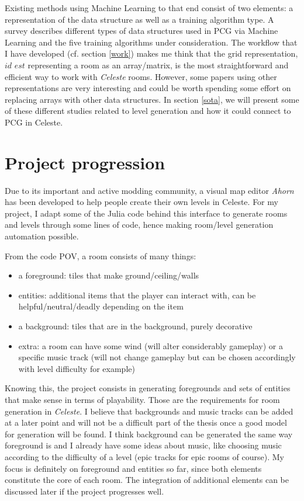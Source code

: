 \documentclass{article}
\newcommand{\Celeste}{\textit{Celeste} }
\newcommand{\Celnosp}{\textit{Celeste}}
\begin{document}
\vspace{0.25cm}
\noindent Existing methods using Machine Learning to that end consist of two elements: a representation of the data structure as well as a training algorithm type. A survey \cite{summer} describes different types of data structures used in PCG via Machine Learning and the five training algorithms under consideration. The workflow that I have developed (cf. section \ref{work}) makes me think that the grid representation, $\textit{id est}$ representing a room as an array/matrix, is the most straightforward and efficient way to work with \Celeste rooms. However, some papers using other representations are very interesting and could be worth spending some effort on replacing arrays with other data structures. In section \ref{sota}, we will present some of these different studies related to level generation and how it could connect to PCG in Celeste.


\section{Project progression \label{work}}
Due to its important and active modding community, a visual map editor \textit{Ahorn} has been developed to help people create their own levels in Celeste. For my project, I adapt some of the Julia code behind this interface to generate rooms and levels through some lines of code, hence making room/level generation automation possible.

\noindent From the code POV, a room consists of many things:
\begin{itemize}
    \item a foreground: tiles that make ground/ceiling/walls
    \item entities: additional items that the player can interact with, can be helpful/neutral/deadly depending on the item
    \item a background: tiles that are in the background, purely decorative
    \item extra: a room can have some wind (will alter considerably gameplay) or a specific music track (will not change gameplay but can be chosen accordingly with level difficulty for example)
\end{itemize}

Knowing this, the project consists in generating foregrounds and sets of  entities that make sense in terms of playability. Those are the requirements for room generation in \Celnosp. I believe that backgrounds and music tracks can be added at a later point and will not be a difficult part of the thesis once a good model for generation will be found. I think background can be generated the same way foreground is and I already have some ideas about music, like choosing music according to the difficulty of a level (epic tracks for epic rooms of course). My focus is definitely on foreground and entities so far, since both elements constitute the core of each room. The integration of additional elements can be discussed later if the project progresses well.
\end{document}
